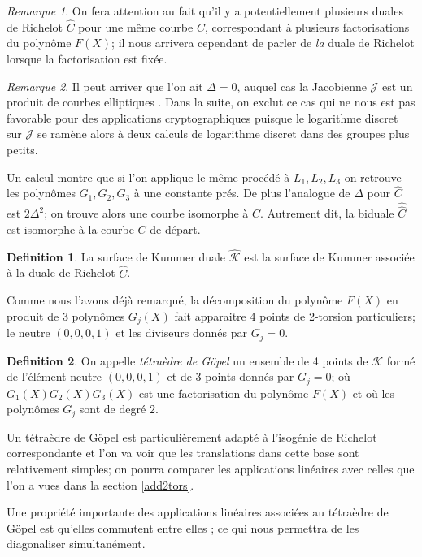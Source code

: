 \documentclass[a4paper,12pt]{article}
\theoremstyle{definition}
\newtheorem{definition}{Definition}[section]
\theoremstyle{remark}
\newtheorem{remarque}{Remarque}
\numberwithin{equation}{section}
\begin{document}
\begin{remarque}
On fera attention au fait qu'il y a potentiellement plusieurs duales de Richelot $\hat{C}$ pour une même courbe $C$, correspondant à plusieurs factorisations du polynôme $F(X)$; il nous arrivera cependant de parler de \emph{la} duale de Richelot lorsque la factorisation est fixée.
\end{remarque}

\begin{remarque}
Il peut arriver que l'on ait $\Delta = 0$, auquel cas la Jacobienne $\mathcal{J}$ est un produit de courbes elliptiques \citep{cassels-Flynn}. Dans la suite, on exclut ce cas qui ne nous est pas favorable pour des applications cryptographiques puisque le logarithme discret sur $\mathcal{J}$ se ramène alors à deux calculs de logarithme discret dans des groupes plus petits.
\end{remarque}

Un calcul montre que si l'on applique le même procédé à $L_1,L_2,L_3$ on retrouve les polynômes $G_1,G_2,G_3$ à une constante prés. De plus l'analogue de $\Delta$ pour $\hat{C}$ est $2\Delta^2$; on trouve alors une courbe isomorphe à $C$. Autrement dit, la biduale $\hat{\hat{C}}$ est isomorphe à la courbe $C$ de départ.

\begin{definition}
La surface de Kummer duale $\hat{\mathcal{K}}$ est la surface de Kummer associée à la duale de Richelot $\hat{C}$.
\end{definition}

Comme nous l'avons déjà remarqué, la décomposition du polynôme $F(X)$ en produit de 3 polynômes $G_j(X)$ fait apparaitre 4 points de 2-torsion particuliers; le neutre $(0,0,0,1)$ et les diviseurs donnés par $G_j=0$.

\begin{definition}
On appelle \emph{tétraèdre de G\"opel} un ensemble de 4 points de $\mathcal{K}$ formé de l'élément neutre $(0,0,0,1)$ et de 3 points donnés par $G_j=0$; où $G_1(X)G_2(X)G_3(X)$ est une factorisation du polynôme $F(X)$ et où les polynômes $G_j$ sont de degré $2$.
\end{definition}

Un tétraèdre de G\"opel est particulièrement adapté à l'isogénie de Richelot correspondante et l'on va voir que les translations dans cette base sont relativement simples; on pourra comparer les applications linéaires avec celles que l'on a vues dans la section \ref{add2tors}.

Une propriété importante des applications linéaires associées au tétraèdre de G\"opel est qu'elles commutent entre elles \citep{cassels-Flynn}; ce qui nous permettra de les diagonaliser simultanément. 
\end{document}
